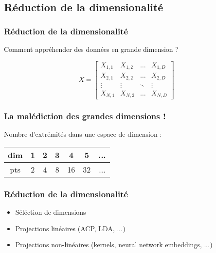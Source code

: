 \subsection{Réduction de la dimensionalité}

\begin{frame}
  \frametitle{Réduction de la dimensionalité}
    \begin{center}
      Comment appréhender des données en grande dimension ?
    \end{center}
    \[
    X = \begin{bmatrix}
      X_{1,1} & X_{1,2} & \dots  & X_{1,D} \\
      X_{2,1} & X_{2,2} & \dots  & X_{2,D} \\
      \vdots & \vdots & \ddots & \vdots \\
      X_{N,1} & X_{N,2} & \dots  & X_{N,D}
    \end{bmatrix}
    \]
\end{frame}

\begin{frame}
  \frametitle{La malédiction des grandes dimensions !}
    \begin{center}
      Nombre d'extrémités dans une espace de dimension : \\
      $\;$ \\
      \begin{tabular}{|c|c|c|c|c|c|c|}
        \hline
        dim & 1 & 2 & 3 & 4 & 5 & ... \\
        \hline
        pts & 2 & 4 & 8 & 16 & 32 & ...\\
        \hline
      \end{tabular}
    \end{center}
\end{frame}

\begin{frame}
  \frametitle{Réduction de la dimensionalité}
    \begin{itemize}
    \item Séléction de dimensions
    \item Projections linéaires (ACP, LDA, ...)
    \item Projections non-linéaires (kernels, neural network embeddings, ...)
    \end{itemize}
\end{frame}
